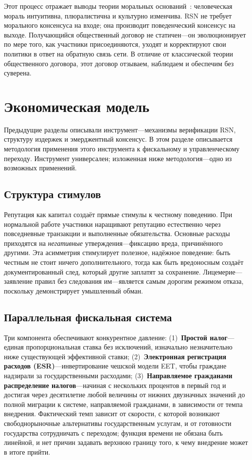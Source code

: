 \documentclass[11pt,a4paper,twocolumn]{article}
\begin{document}
Этот процесс отражает выводы теории моральных оснований~\cite{haidt2012}: человеческая мораль интуитивна, плюралистична и культурно изменчива. RSN не требует морального консенсуса на входе; она производит поведенческий консенсус на выходе. Получающийся общественный договор не статичен---он эволюционирует по мере того, как участники присоединяются, уходят и корректируют свои политики в ответ на обратную связь сети. В отличие от классической теории общественного договора, этот договор отзываем, наблюдаем и обеспечим без суверена.

\section{Экономическая модель}

Предыдущие разделы описывали инструмент---механизмы верификации RSN, структуру издержек и эмерджентный консенсус. В этом разделе описывается методология применения этого инструмента к фискальному и управленческому переходу. Инструмент универсален; изложенная ниже методология---одно из возможных применений.

\subsection{Структура стимулов}

Репутация как капитал создаёт прямые стимулы к честному поведению. При нормальной работе участники наращивают репутацию естественно через повседневные транзакции и выполненные обязательства. Основные расходы приходятся на \emph{негативные} утверждения---фиксацию вреда, причинённого другими. Эта асимметрия стимулирует полезное, надёжное поведение: быть честным не стоит ничего дополнительного, тогда как быть вредоносным создаёт документированный след, который другие заплатят за сохранение. Лицемерие---заявление правил без следования им---является самым дорогим режимом отказа, поскольку демонстрирует умышленный обман.

\subsection{Параллельная фискальная система}

Три компонента обеспечивают конкурентное давление: (1)~\textbf{Простой налог}---единая пропорциональная ставка без исключений, изначально незначительно ниже существующей эффективной ставки; (2)~\textbf{Электронная регистрация расходов (ESR)}---инвертирование чешской модели EET, чтобы граждане надзирали за государственными расходами; (3)~\textbf{Направляемое гражданами распределение налогов}---начиная с нескольких процентов в первый год и достигая через десятилетие любой величины от нижних двузначных значений до полной миграции к системе, направляемой гражданами, в зависимости от темпа внедрения. Фактический темп зависит от скорости, с которой возникают свободнорыночные альтернативы государственным услугам, и от готовности государства сотрудничать с переходом; функция времени не обязана быть линейной, и нет причин задавать верхнюю границу того, к чему внедрение может в итоге прийти.
\end{document}
